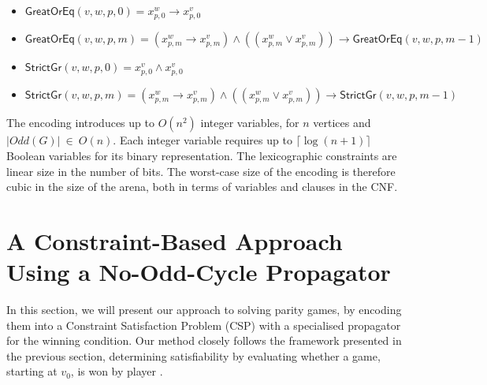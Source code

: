 \documentclass[a4paper,UKenglish,cleveref, autoref, thm-restate, anonymous]{lipics-v2021}
\begin{document}
\begin{itemize}
    \item $\mathsf{GreatOrEq}(v, w, p, 0) = x_{p,0}^w \rightarrow x_{p,0}^v$
    \item $\mathsf{GreatOrEq}(v, w, p, m) = (x_{p,m}^w \rightarrow x_{p,m}^v) \wedge ((x_{p,m}^w \vee x_{p,m}^v)) \rightarrow \mathsf{GreatOrEq}(v, w, p, m-1)$
    \item $\mathsf{StrictGr}(v, w, p, 0) = x_{p,0}^v \wedge x_{p,0}^v$
    \item $\mathsf{StrictGr}(v, w, p, m) = (x_{p,m}^w \rightarrow x_{p,m}^v) \wedge ((x_{p,m}^w \vee x_{p,m}^v)) \rightarrow \mathsf{StrictGr}(v, w, p, m-1)$\end{itemize}

The encoding introduces up to $O(n^2)$ integer variables, for $n$ vertices and $|\textit{Odd}(G)|\ \in\ O(n)$. Each integer variable requires up to $\lceil \log(n+1) \rceil$ Boolean variables for its binary representation. The lexicographic constraints are linear size in the number of bits. The worst-case size of the encoding is therefore cubic in the size of the arena, both in terms of variables and clauses in the CNF.

\section{A Constraint-Based Approach Using a No-Odd-Cycle Propagator}

In this section, we will present our approach to solving parity games, by encoding them into a Constraint Satisfaction Problem (CSP) with a specialised propagator for the winning condition. Our method closely follows the framework presented in the previous section, determining satisfiability by evaluating whether a game, starting at $v_0$, is won by player \even.





\end{document}
